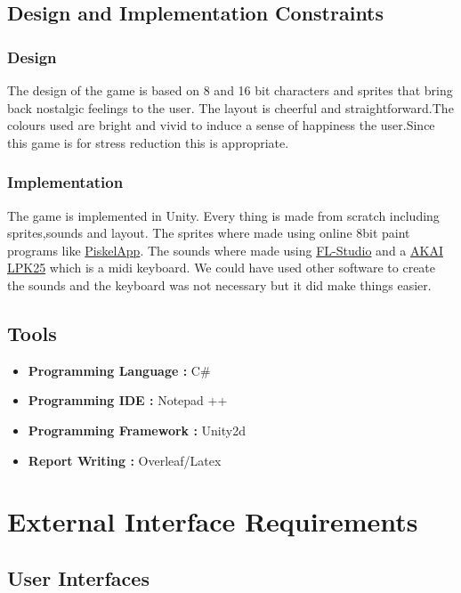 \section{Design and Implementation Constraints}
\subsection {Design}
The design of the game is based on 8 and 16 bit characters and sprites that bring back nostalgic feelings to the user. The layout is cheerful and straightforward.The colours used are bright and vivid to induce a sense of happiness the user.Since this game is for stress reduction this is appropriate.
\subsection{Implementation}
The game is implemented in Unity. Every thing is made from scratch including sprites,sounds and layout.
The sprites where made using online 8bit paint programs like \href{https://www.piskelapp.com/}{PiskelApp}.
The sounds where made using \href{https://www.image-line.com/flstudio/}{FL-Studio} and a \href{https://www.amazon.co.uk/AKAI-Professional-LPK25-Portable-Controller/dp/B002M8GBDI}{AKAI LPK25} which is a midi keyboard.
We could have used other software to create the sounds and the keyboard was not necessary but it did make things easier.
\section{Tools}
\begin{itemize}
	\item \textbf{Programming Language :} C\#
	\item \textbf{Programming IDE :} Notepad ++
	\item \textbf{Programming Framework :} Unity2d
	\item \textbf{Report Writing :} Overleaf/Latex
\end{itemize}
\newpage




\chapter{External Interface Requirements}
\label{External Interface Requirements}

\section{User Interfaces}

